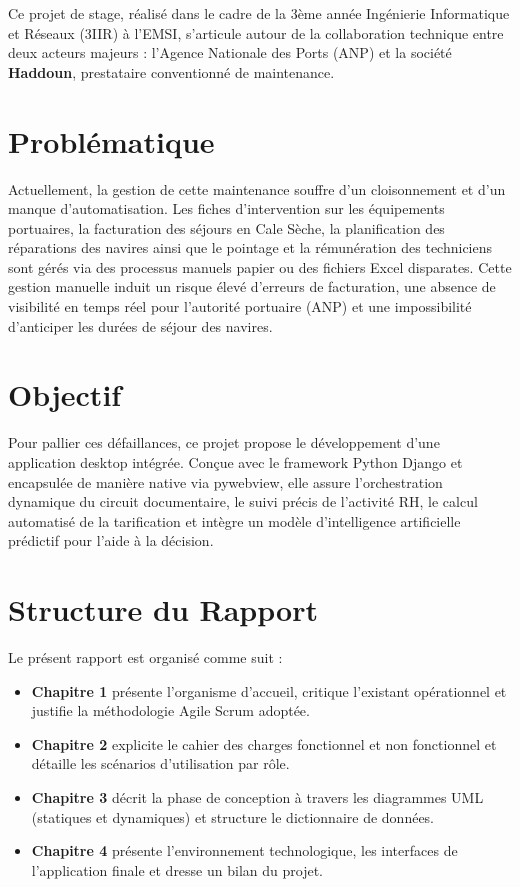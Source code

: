 \documentclass[12pt,a4paper,oneside]{report}
\begin{document}
Ce projet de stage, réalisé dans le cadre de la 3ème année Ingénierie Informatique et Réseaux (3IIR) à l'EMSI, s'articule autour de la collaboration technique entre deux acteurs majeurs : l'Agence Nationale des Ports (ANP) et la société \textbf{Haddoun}, prestataire conventionné de maintenance.

\section*{Problématique}
Actuellement, la gestion de cette maintenance souffre d'un cloisonnement et d'un manque d'automatisation. Les fiches d'intervention sur les équipements portuaires, la facturation des séjours en Cale Sèche, la planification des réparations des navires ainsi que le pointage et la rémunération des techniciens sont gérés via des processus manuels papier ou des fichiers Excel disparates. Cette gestion manuelle induit un risque élevé d'erreurs de facturation, une absence de visibilité en temps réel pour l'autorité portuaire (ANP) et une impossibilité d'anticiper les durées de séjour des navires.

\section*{Objectif}
Pour pallier ces défaillances, ce projet propose le développement d'une application desktop intégrée. Conçue avec le framework Python Django et encapsulée de manière native via pywebview, elle assure l'orchestration dynamique du circuit documentaire, le suivi précis de l'activité RH, le calcul automatisé de la tarification et intègre un modèle d'intelligence artificielle prédictif pour l'aide à la décision.

\section*{Structure du Rapport}
Le présent rapport est organisé comme suit :
\begin{itemize}
    \item \textbf{Chapitre 1} présente l'organisme d'accueil, critique l'existant opérationnel et justifie la méthodologie Agile Scrum adoptée.
    \item \textbf{Chapitre 2} explicite le cahier des charges fonctionnel et non fonctionnel et détaille les scénarios d'utilisation par rôle.
    \item \textbf{Chapitre 3} décrit la phase de conception à travers les diagrammes UML (statiques et dynamiques) et structure le dictionnaire de données.
    \item \textbf{Chapitre 4} présente l'environnement technologique, les interfaces de l'application finale et dresse un bilan du projet.
\end{itemize}
\end{document}
